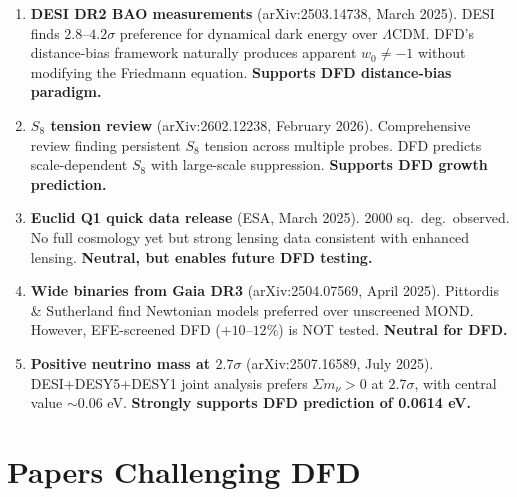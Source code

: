 \documentclass[11pt,a4paper]{article}
\begin{document}
\begin{enumerate}
\item \textbf{DESI DR2 BAO measurements} (arXiv:2503.14738, March 2025). DESI finds $2.8$--$4.2\sigma$ preference for dynamical dark energy over $\Lambda$CDM. DFD's distance-bias framework naturally produces apparent $w_0 \neq -1$ without modifying the Friedmann equation. \textbf{Supports DFD distance-bias paradigm.}

\item \textbf{$S_8$ tension review} (arXiv:2602.12238, February 2026). Comprehensive review finding persistent $S_8$ tension across multiple probes. DFD predicts scale-dependent $S_8$ with large-scale suppression. \textbf{Supports DFD growth prediction.}

\item \textbf{Euclid Q1 quick data release} (ESA, March 2025). 2000 sq.\ deg.\ observed. No full cosmology yet but strong lensing data consistent with enhanced lensing. \textbf{Neutral, but enables future DFD testing.}

\item \textbf{Wide binaries from Gaia DR3} (arXiv:2504.07569, April 2025). Pittordis \& Sutherland find Newtonian models preferred over unscreened MOND. However, EFE-screened DFD ($+10$--$12\%$) is NOT tested. \textbf{Neutral for DFD.}

\item \textbf{Positive neutrino mass at $2.7\sigma$} (arXiv:2507.16589, July 2025). DESI+DESY5+DESY1 joint analysis prefers $\Sigma m_\nu > 0$ at $2.7\sigma$, with central value $\sim 0.06$ eV. \textbf{Strongly supports DFD prediction of 0.0614 eV.}
\end{enumerate}

\section{Papers Challenging DFD}
\end{document}
